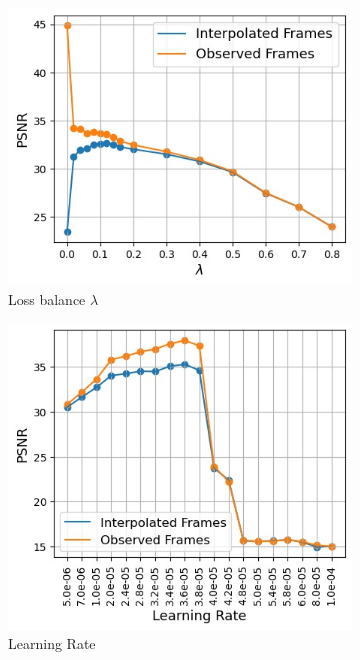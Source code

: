 \documentclass{article}
\begin{document}
\begin{figure}[h]
\centering
\begin{subfigure}{0.3\textwidth}
	\centering
    \includegraphics[width=1\linewidth]{lambda.jpg}
	\caption{Loss balance $\lambda$}
\end{subfigure}%
\begin{subfigure}{0.27\textwidth}
\centering
    \includegraphics[width=1\linewidth]{LR.jpg}
	\caption{Learning Rate}
\end{subfigure}%
\begin{subfigure}{0.31\textwidth}

\end{subfigure}
\end{figure}
\end{document}
